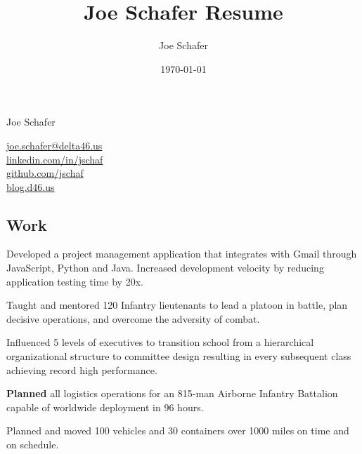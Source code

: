 \documentclass[letterpaper,11pt]{jschaf-resume}
\title{Joe Schafer Resume}
\author{Joe Schafer}
\date{\today}
\makeatletter
\newcommand*{\emailLink}{\href{mailto:joe.schafer@delta46.us}{joe.schafer@delta46.us}}
\newcommand*{\linkedInLink}{\href{http://linkedin.com/in/jschaf}{linkedin.com/in/jschaf}}
\newcommand*{\githubLink}{\href{http://github.com/jschaf}{github.com/jschaf}}
\newcommand*{\blogLink}{\href{http://blog.d46.us}{blog.d46.us}}
\newcommand*{\action}[1]{\textbf{#1}}
\makeatother
\begin{document}


\begin{paracol}{2}
{\fontsize{32px}{48px}\selectfont Joe Schafer}

\switchcolumn

\emailLink\\
\linkedInLink\\
\githubLink\\
\blogLink\\

\end{paracol}


\begin{paracol}{2}

\section*{Work}

\begin{workitems}
  \item Developed a project management application that integrates with Gmail
  through JavaScript, Python and Java.  Increased development velocity by
  reducing application testing time by 20x.
\end{workitems}

\begin{workitems}
  \item Taught and mentored 120 Infantry lieutenants to lead a platoon in
  battle, plan decisive operations, and overcome the adversity of combat.
  \item Influenced 5 levels of executives to transition school from a
  hierarchical organizational structure to committee design resulting in every
  subsequent class achieving record high performance.
\end{workitems}

\begin{workitems}
\item \action{Planned} all logistics operations for an 815-man Airborne Infantry
  Battalion capable of worldwide deployment in 96 hours.

\item Planned and moved 100 vehicles and 30 containers over 1000 miles on time
  and on schedule.


\end{workitems}
\end{paracol}
\end{document}

